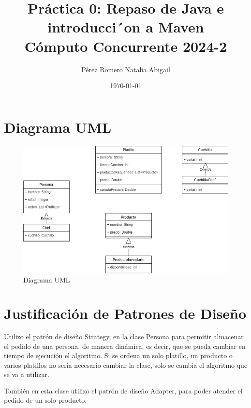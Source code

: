 \documentclass{article}
\title{Práctica 0: Repaso de Java e introducci´on a Maven \\ Cómputo Concurrente 2024-2}
\author{Pérez Romero Natalia Abigail}
\date{\today}
\begin{document}
\maketitle

\section{Diagrama UML}

\begin{figure}[h]
    \centering
    \includegraphics[width=\textwidth]{UML.png}
    \caption{Diagrama UML}
    \label{fig:UML}
\end{figure}

\section{Justificación de Patrones de Diseño}

Utilizo el patrón de diseño Strategy, en la clase Persona para permitir almacenar el pedido de una persona, de manera dinámica, es decir, que se pueda cambiar en tiempo de ejecución el algoritmo. Si se ordena un solo platillo, un producto o varios platillos no seria necesario cambiar la clase, solo se cambia el algoritmo que se va a utilizar.
 
También en esta clase utilizo el patrón de diseño Adapter, para poder atender el pedido de un solo producto.
\end{document}
